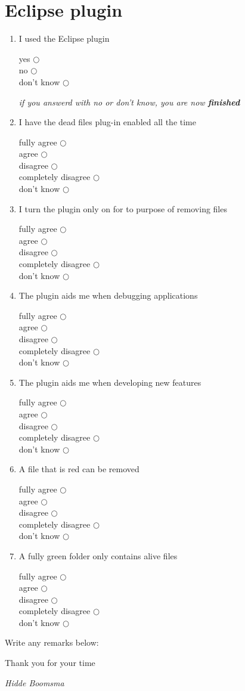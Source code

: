 \documentclass[10pt,a4paper]{article}
\newcommand{\choice}{
\begin{flushright}
fully agree $\bigcirc$ \\
agree $\bigcirc$\\
disagree $\bigcirc$ \\
completely disagree $\bigcirc$ \\ 
don't know $\bigcirc$
\end{flushright} 
}
\newcommand{\yesno}{
 \begin{flushright}
 yes $\bigcirc$ \\
 no $\bigcirc$ \\
 don't know $\bigcirc$
\end{flushright} 
}
\begin{document}
\section{Eclipse plugin}
\begin{enumerate}[resume]
	\item I used the Eclipse plugin\yesno
	\hfill\textit{if you answerd with no or don't know, you are now \textbf{finished}}
	\item I have the dead files plug-in enabled all the time\choice
	\item I turn the plugin only on for to purpose of removing files\choice
	\item The plugin aids me when debugging applications\choice
	\item The plugin aids me when developing new features\choice
	\item A file that is red can be removed\choice
	\newpage
	\item A fully green folder only contains alive files\choice
\end{enumerate}

\noindent Write any remarks below:

\vfill
\begin{flushright}
Thank you for your time

\textit{Hidde Boomsma}
\end{flushright}
\end{document}
